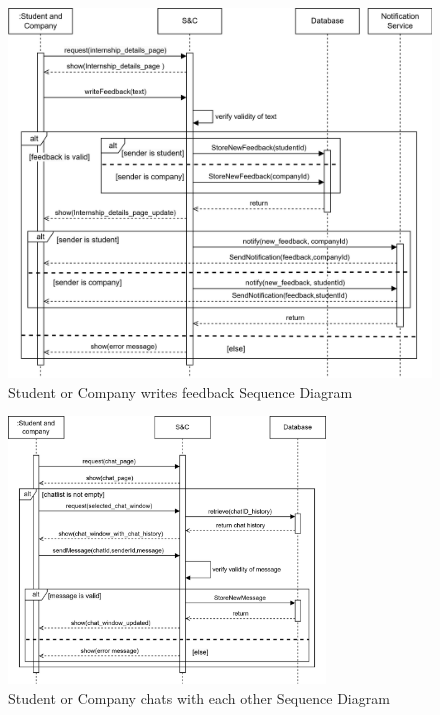 \begin{figure}[H]
    \centering
    \includegraphics[width=1\textwidth]{Images/Sequence_Diagrams/feedback_SD.png}
    \caption{Student or Company writes feedback Sequence Diagram}
\end{figure}
\begin{figure}[H]
    \centering
    \includegraphics[width=0.75\textwidth]{Images/Sequence_Diagrams/chatting_SD.png}
    \caption{Student or Company chats with each other Sequence Diagram}
\end{figure}
